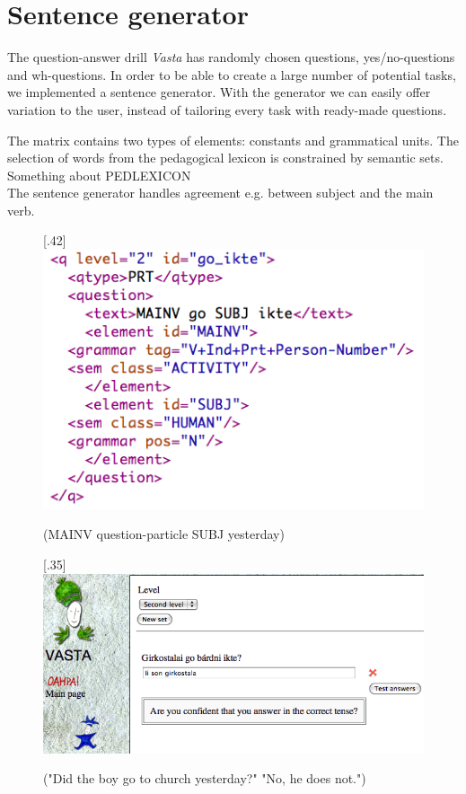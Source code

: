 \documentclass[11pt]{article}
\begin{document}
\section{Sentence generator}
The question-answer drill \textit{Vasta} has randomly chosen questions, yes/no-questions and wh-questions. In order to be able to create a large number of potential tasks, we implemented a sentence generator. With the generator we can easily offer variation to the user, instead of tailoring every task with ready-made questions.

The matrix contains two types of elements: constants and grammatical units. The selection of words from the pedagogical lexicon is constrained by semantic sets. Something about PEDLEXICON \\ The sentence generator handles agreement e.g. between subject and the main verb.

\begin{figure}%
\begin{center}
\scalebox{.42}[.42]{\includegraphics{presentation/img/sentencegenerator.png}}\\
\caption{(MAINV question-particle SUBJ yesterday)}
\end{center}
\end{figure}

\begin{figure}%
\begin{center}
\scalebox{.35}[.35]{\includegraphics{presentation/img/Vasta_sentencegen_example.png}}\\
\caption{("Did the boy go to church yesterday?" 
"No, he does not.")}
\end{center}
\end{figure}
 
\end{document}
